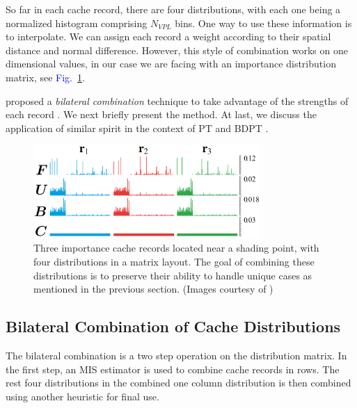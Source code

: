 \documentclass[]{book}
\renewcommand{\figurename}{\textcolor{blue}{Fig.\ }}
\begin{document}
So far in each cache record, there are four distributions, with each one being a normalized histogram comprising $N_{VPL}$ bins.
One way to use these information is to interpolate.
We can assign each record a weight according to their spatial distance and normal difference.
However, this style of combination works on one dimensional values, in our case we are facing with an importance distribution matrix, see \figurename \ref{fig:IMP:records}.

\citeauthor{georgiev2012importance} proposed a \textit{bilateral combination} technique to take advantage of the strengths of each record \cite{georgiev2012importance}.
We next briefly present the method.
At last, we discuss the application of similar spirit in the context of PT \cite{bashford2012significance} and BDPT \cite{popov2015probabilistic}.

\begin{figure}[b]
	\centering
	\includegraphics[height=1.4in]{img/IMP_5a.png}
	\caption[Importance Distribution Matrix]{Three importance cache records located near a shading point, with four distributions in a matrix layout. The goal of combining these distributions is to preserve their ability to handle unique cases as mentioned in the previous section. (Images courtesy of \citeauthor{georgiev2012importance})}
	\label{fig:IMP:records}
\end{figure}

\subsection{Bilateral Combination of Cache Distributions}
\label{sec:imp_cache:use_cache:combine}
The bilateral combination is a two step operation on the distribution matrix.
In the first step, an MIS estimator is used to combine cache records in rows.
The rest four distributions in the combined one column distribution is then combined using another heuristic for final use.
\end{document}
